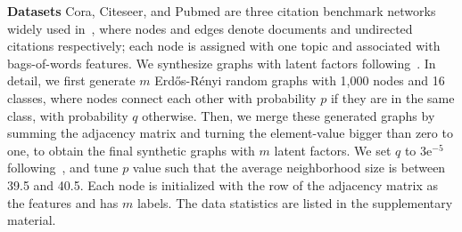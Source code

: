 \documentclass[accepted]{uai2021} %
\begin{document}
\textbf{Datasets} Cora, Citeseer, and Pubmed are three citation benchmark networks widely used in~\citep{Kipf2017SemiSupervisedCW,Hamilton2017InductiveRL,Velickovic2018GraphAN}, where nodes and edges denote documents and undirected citations respectively; each node is assigned with one topic and associated with bags-of-words features. We synthesize graphs with latent factors following~\citep{Ma2019DisentangledGC}. In detail, we first generate $m$ Erd{\H{o}}s-R{\'e}nyi random graphs with 1,000 nodes and 16 classes, where nodes connect each other with probability $p$ if they are in the same class, with probability $q$ otherwise. Then, we merge these generated graphs by summing the adjacency matrix and turning the element-value bigger than zero to one, to obtain the final synthetic graphs with $m$ latent factors. We set $q$ to 3e$^{-5}$ following~\citep{Ma2019DisentangledGC}, and tune $p$ value such that the average neighborhood size is between 39.5 and 40.5. Each node is initialized with the row of the adjacency matrix as the features and has $m$ labels. The data statistics are listed in the supplementary material.
\end{document}
